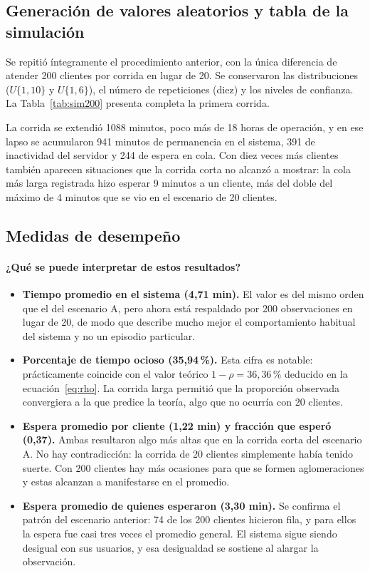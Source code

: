 \documentclass[11pt,letterpaper]{article}
\begin{document}
\subsection{Generación de valores aleatorios y tabla de la simulación}

Se repitió íntegramente el procedimiento anterior, con la única diferencia de atender 200 clientes por corrida en lugar de 20. Se conservaron las distribuciones ($U\{1,10\}$ y $U\{1,6\}$), el número de repeticiones (diez) y los niveles de confianza. La Tabla~\ref{tab:sim200} presenta completa la primera corrida.



La corrida se extendió 1088 minutos, poco más de 18 horas de operación, y en ese lapso se acumularon 941 minutos de permanencia en el sistema, 391 de inactividad del servidor y 244 de espera en cola. Con diez veces más clientes también aparecen situaciones que la corrida corta no alcanzó a mostrar: la cola más larga registrada hizo esperar 9 minutos a un cliente, más del doble del máximo de 4 minutos que se vio en el escenario de 20 clientes.

\subsection{Medidas de desempeño}



\paragraph{¿Qué se puede interpretar de estos resultados?}

\begin{itemize}[itemsep=3pt]
    \item \textbf{Tiempo promedio en el sistema (4,71 min).} El valor es del mismo orden que el del escenario A, pero ahora está respaldado por 200 observaciones en lugar de 20, de modo que describe mucho mejor el comportamiento habitual del sistema y no un episodio particular.
    \item \textbf{Porcentaje de tiempo ocioso (35,94\,\%).} Esta cifra es notable: prácticamente coincide con el valor teórico $1 - \rho = 36{,}36\,\%$ deducido en la ecuación~\eqref{eq:rho}. La corrida larga permitió que la proporción observada convergiera a la que predice la teoría, algo que no ocurría con 20 clientes.
    \item \textbf{Espera promedio por cliente (1,22 min) y fracción que esperó (0,37).} Ambas resultaron algo más altas que en la corrida corta del escenario A. No hay contradicción: la corrida de 20 clientes simplemente había tenido suerte. Con 200 clientes hay más ocasiones para que se formen aglomeraciones y estas alcanzan a manifestarse en el promedio.
    \item \textbf{Espera promedio de quienes esperaron (3,30 min).} Se confirma el patrón del escenario anterior: 74 de los 200 clientes hicieron fila, y para ellos la espera fue casi tres veces el promedio general. El sistema sigue siendo desigual con sus usuarios, y esa desigualdad se sostiene al alargar la observación.
\end{itemize}
\end{document}
